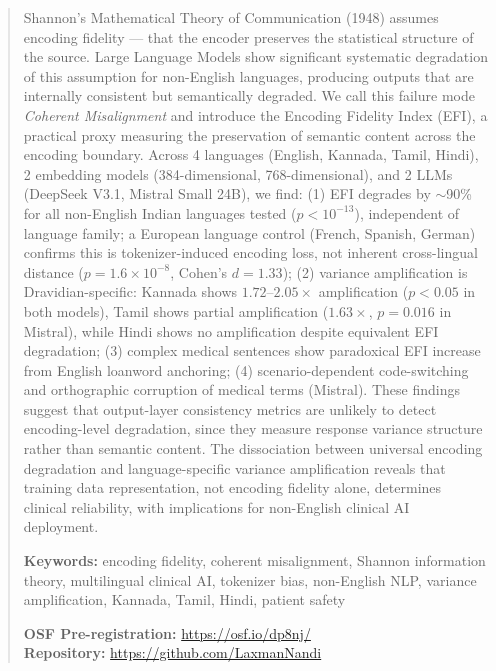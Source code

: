 \documentclass[11pt,a4paper]{article}
\begin{document}
\begin{abstract}
\noindent Shannon's Mathematical Theory of Communication (1948) assumes encoding fidelity --- that the encoder preserves the statistical structure of the source. Large Language Models show significant systematic degradation of this assumption for non-English languages, producing outputs that are internally consistent but semantically degraded. We call this failure mode \emph{Coherent Misalignment} and introduce the Encoding Fidelity Index (EFI), a practical proxy measuring the preservation of semantic content across the encoding boundary. Across 4 languages (English, Kannada, Tamil, Hindi), 2 embedding models (384-dimensional, 768-dimensional), and 2 LLMs (DeepSeek V3.1, Mistral Small 24B), we find: (1) EFI degrades by $\sim$90\% for all non-English Indian languages tested ($p < 10^{-13}$), independent of language family; a European language control (French, Spanish, German) confirms this is tokenizer-induced encoding loss, not inherent cross-lingual distance ($p = 1.6 \times 10^{-8}$, Cohen's $d = 1.33$); (2) variance amplification is Dravidian-specific: Kannada shows $1.72$--$2.05\times$ amplification ($p < 0.05$ in both models), Tamil shows partial amplification ($1.63\times$, $p = 0.016$ in Mistral), while Hindi shows no amplification despite equivalent EFI degradation; (3) complex medical sentences show paradoxical EFI increase from English loanword anchoring; (4) scenario-dependent code-switching and orthographic corruption of medical terms (Mistral). These findings suggest that output-layer consistency metrics are unlikely to detect encoding-level degradation, since they measure response variance structure rather than semantic content. The dissociation between universal encoding degradation and language-specific variance amplification reveals that training data representation, not encoding fidelity alone, determines clinical reliability, with implications for non-English clinical AI deployment.

\vspace{0.5em}
\noindent\textbf{Keywords:} encoding fidelity, coherent misalignment, Shannon information theory, multilingual clinical AI, tokenizer bias, non-English NLP, variance amplification, Kannada, Tamil, Hindi, patient safety

\vspace{0.5em}
\noindent\textbf{OSF Pre-registration:} \url{https://osf.io/dp8nj/}\\
\noindent\textbf{Repository:} \url{https://github.com/LaxmanNandi}
\end{abstract}
\end{document}
